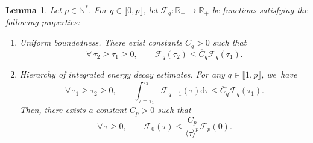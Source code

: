 \documentclass[10pt]{amsart}
\theoremstyle{plain}
\newtheorem{lemma}[proposition]{Lemma}
\theoremstyle{definition}
\newcommand\R{{\mathbb{R}}}
\newcommand\dr{{\mathrm{d}}}
\begin{document}
\begin{lemma}\label{Lemrpmethod}
Let $p \in \mathbb{N}^*$. For $q \in \llbracket 0, p \rrbracket$, let $\mathcal{F}_q \colon \R_+ \to \R_+$ be functions satisfying the following properties:
\begin{enumerate}
\item \label{assum1unifbound} Uniform boundedness. There exist constants $\overline{C}_q >0$ such that
\[
\forall \, \tau_2 \geq \tau_1 \geq 0,\qquad \mathcal{F}_q (\tau_2) \leq \overline{C}_q \mathcal{F}_q (\tau_1).
\]
\item \label{assum2hierenergest} Hierarchy of integrated energy decay estimates. For any $q \in \llbracket 1, p \rrbracket$, we~have
\[
\forall \, \tau_1 \geq \tau_2 \geq 0,\qquad \int_{\tau=\tau_1}^{\tau_2} \mathcal{F}_{q-1}(\tau) \dr \tau \leq \overline{C}_q \mathcal{F}_q (\tau_1).
\]
Then, there exists a constant $C_p>0$ such that
\[
\forall \, \tau \geq 0, \qquad \mathcal{F}_0(\tau) \leq \frac{C_p}{\langle \tau\rangle^p} \mathcal{F}_p(0).
\]
\end{enumerate}
\end{lemma}
\end{document}
